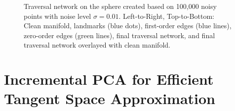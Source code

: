 \begin{figure}[htbp]
    \centering
    
    \caption{Traversal network on the sphere created based on 100,000 noisy points with noise level $\sigma=0.01$. Left-to-Right, Top-to-Bottom: Clean manifold, landmarks (blue dots), first-order edges (blue lines), zero-order edges (green lines), final traversal network, and final traversal network overlayed with clean manifold.}
    \label{fig:sphere_visual}
\end{figure}















\section{Incremental PCA for Efficient Tangent Space Approximation} \label{sec:ipca_description}

